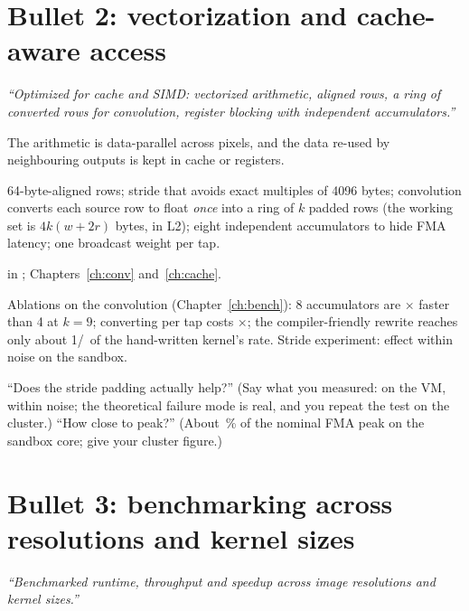 \section{Bullet 2: vectorization and cache-aware access}
\textit{``Optimized for cache and SIMD: vectorized arithmetic, aligned rows, a ring of converted rows for convolution, register blocking with independent accumulators.''}

\begin{description}[leftmargin=2.2cm,style=nextline]
\item[What] The arithmetic is data-parallel across pixels, and the data re-used by neighbouring outputs is kept in cache or registers.
\item[How] 64-byte-aligned rows; stride that avoids exact multiples of 4096 bytes; convolution converts each source row to float \emph{once} into a ring of $k$ padded rows (the working set is $4k(w+2r)$ bytes, in L2); eight independent accumulators to hide FMA latency; one broadcast weight per tap.
\item[Where]  in ; Chapters~\ref{ch:conv} and~\ref{ch:cache}.
\item[Evidence] Ablations on the convolution (Chapter~\ref{ch:bench}): 8 accumulators are \ratioAccFourNine$\times$ faster than 4 at $k=9$; converting per tap costs \ratioPerTapNine$\times$; the compiler-friendly rewrite reaches only about 1/\ratioRowAccToAvx\ of the hand-written kernel's rate. Stride experiment: effect within noise on the sandbox.
\item[Expect] ``Does the stride padding actually help?'' (Say what you measured: on the VM, within noise; the theoretical failure mode is real, and you repeat the test on the cluster.) ``How close to peak?'' (About \fracOfNominalPeak\,\% of the nominal FMA peak on the sandbox core; give your cluster figure.)
\end{description}

\section{Bullet 3: benchmarking across resolutions and kernel sizes}
\textit{``Benchmarked runtime, throughput and speedup across image resolutions and kernel sizes.''}

